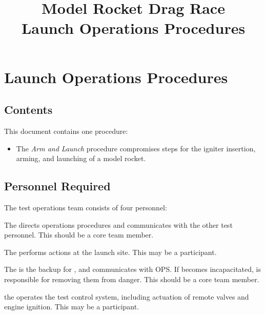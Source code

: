 

\title{\Huge Model Rocket Drag Race\\
\vspace{1cm}
\Large Launch Operations Procedures}





\section{Launch Operations Procedures}

\subsection{Contents}
This document contains one procedure:
\begin{itemize}
  \item The \textit{Arm and Launch} procedure compromises steps for the igniter insertion, arming, and launching of a model rocket.
\end{itemize}

\subsection{Personnel Required}
The test operations team consists of four personnel:
\begin{checklist}
  \item The \opsfull{} directs operations procedures and communicates with the other test personnel. This should be a core team member.
  \item The \primaryfull{} performs actions at the launch site. This may be a participant.
  \item The \secondaryfull{} is the backup for \primary{}, and communicates with OPS. If \primary{} becomes incapacitated, \secondary{} is responsible for removing them from danger. This should be a core team member.
  \item the \controlfull{} operates the test control system, including actuation of remote valves and engine ignition. This may be a participant.
\end{checklist}
\setcounter{checklistnum}{0}

